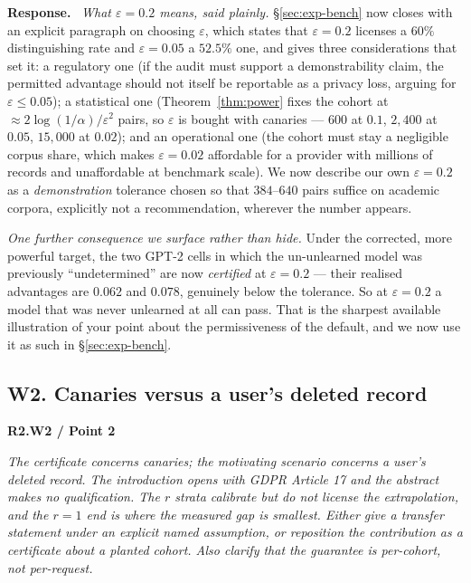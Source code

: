 \documentclass[11pt,a4paper]{article}
\newcommand{\eps}{\varepsilon}
\newenvironment{point}[1]{%
  \par\medskip\noindent\textbf{\color{rcol}#1}\par\nopagebreak\smallskip\begingroup
  \color{rcol}\itshape}{\endgroup\par}
\newenvironment{reply}{%
  \par\smallskip\noindent\textbf{\color{acol}Response.}\ \begingroup}{\endgroup\par}
\begin{document}
\begin{reply}
\emph{What $\eps = 0.2$ means, said plainly.} \S\ref{sec:exp-bench} now closes with an explicit
paragraph on choosing $\eps$, which states that $\eps=0.2$ licenses a $60\%$
distinguishing rate and $\eps=0.05$ a $52.5\%$ one, and gives three considerations that
set it: a regulatory one (if the audit must support a demonstrability claim, the
permitted advantage should not itself be reportable as a privacy loss, arguing for
$\eps \le 0.05$); a statistical one (Theorem~\ref{thm:power} fixes the cohort at
$\approx 2\log(1/\alpha)/\eps^2$ pairs, so $\eps$ is bought with canaries --- $600$ at
$0.1$, $2{,}400$ at $0.05$, $15{,}000$ at $0.02$); and an operational one (the cohort must
stay a negligible corpus share, which makes $\eps=0.02$ affordable for a provider with
millions of records and unaffordable at benchmark scale). We now describe our own
$\eps=0.2$ as a \emph{demonstration} tolerance chosen so that $384$--$640$ pairs suffice
on academic corpora, explicitly not a recommendation, wherever the number appears.

\emph{One further consequence we surface rather than hide.} Under the corrected, more
powerful target, the two GPT-2 cells in which the un-unlearned model was previously
``undetermined'' are now \emph{certified} at $\eps=0.2$ --- their realised advantages are
$0.062$ and $0.078$, genuinely below the tolerance. So at $\eps=0.2$ a model that was
never unlearned at all can pass. That is the sharpest available illustration of your
point about the permissiveness of the default, and we now use it as such in \S\ref{sec:exp-bench}.
\end{reply}

\subsection*{W2. Canaries versus a user's deleted record}

\begin{point}{R2.W2 / Point 2}
The certificate concerns canaries; the motivating scenario concerns a user's deleted
record. The introduction opens with GDPR Article 17 and the abstract makes no
qualification. The $r$ strata calibrate but do not license the extrapolation, and the
$r=1$ end is where the measured gap is smallest. Either give a transfer statement under
an explicit named assumption, or reposition the contribution as a certificate about a
planted cohort. Also clarify that the guarantee is per-cohort, not per-request.
\end{point}
\end{document}
